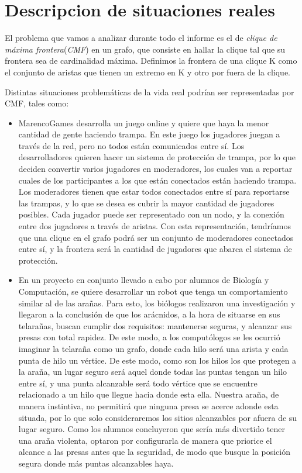 \section{Descripcion de situaciones reales}
El problema que vamos a analizar durante todo el informe es el de \textit{clique de máxima frontera}(\textit{CMF}) en un grafo, que consiste en hallar la clique tal que su frontera sea de cardinalidad máxima. Definimos la frontera de una clique K como el conjunto de aristas que tienen un extremo en K y otro por fuera de la clique.

Distintas situaciones problemáticas de la vida real podrían ser representadas por CMF, tales como:

\begin{itemize}

\item MarencoGames desarrolla un juego online y quiere que haya la menor cantidad de gente haciendo trampa. En este juego los jugadores juegan a través de la red, pero no todos están comunicados entre sí. Los desarrolladores quieren hacer un sistema de protección de trampa, por lo que deciden convertir varios jugadores en moderadores, los cuales van a reportar cuales de los participantes a los que están conectados están haciendo trampa. Los moderadores tienen que estar todos conectados entre sí para reportarse las trampas, y lo que se desea es cubrir la mayor cantidad de jugadores posibles.  Cada jugador puede ser representado con un nodo, y la conexión entre dos jugadores a través de aristas. Con esta representación, tendríamos que una clique en el grafo podrá ser un conjunto de moderadores conectados entre sí, y la frontera será la cantidad de jugadores que abarca el sistema de protección.

\item En un proyecto en conjunto llevado a cabo por alumnos de Biología y Computación, se quiere desarrollar un robot que tenga un comportamiento similar al de las arañas. Para esto, los biólogos realizaron una investigación y llegaron a la conclusión de que los arácnidos, a la hora de situarse en sus telarañas, buscan cumplir dos requisitos: mantenerse seguras, y alcanzar sus presas con total rapidez. De este modo, a los computólogos se les ocurrió imaginar la telaraña como un grafo, donde cada hilo será una arista y cada punta de hilo un vértice. De este modo, como son los hilos los que protegen a la araña, un lugar seguro será aquel donde todas las puntas tengan un hilo entre sí, y una punta alcanzable será todo vértice que se encuentre relacionado a un hilo que llegue hacia donde esta ella. Nuestra araña, de manera instintiva, no permitirá que ninguna presa se acerce adonde esta situada, por lo que solo consideraremos los sitios alcanzables por afuera de su lugar seguro. Como los alumnos concluyeron que sería más divertido tener una araña violenta, optaron por configurarla de manera que priorice el alcance a las presas antes que la seguridad, de modo que busque la posición segura donde más puntas alcanzables haya.


\end{itemize}


